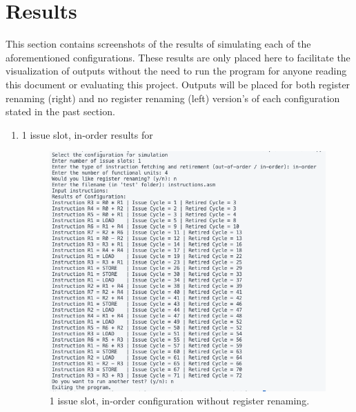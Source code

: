 \documentclass{article}
\begin{document}
\section{Results}
This section contains screenshots of the results of simulating each of the aforementioned configurations. These results are only placed here to facilitate the visualization of outputs without the need to run the program for anyone reading this document or evaluating this project. Outputs will be placed for both register renaming (right) and no register renaming (left) version's of each configuration stated in the past section. 
\begin{enumerate}
    \item 1 issue slot, in-order results for 
    \begin{figure}[H]
        \centering 
        \begin{minipage}[t]{0.45\textwidth}
            \centering
            \includegraphics[width=\textwidth]{Images/Config1.png}
            \caption{1 issue slot, in-order configuration without register renaming.}
        \end{minipage}
        \hfill
        \begin{minipage}[t]{0.45\textwidth}
            \centering 

\end{minipage}
\end{figure}
\end{enumerate}
\end{document}

